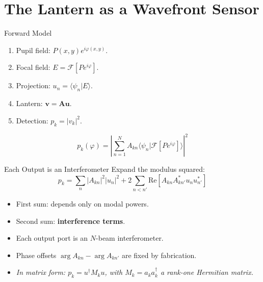 \documentclass[aspectratio=169,10pt]{beamer}
\begin{document}
\section{The Lantern as a Wavefront Sensor}
\begin{frame}{Forward Model}
\begin{enumerate}
    \item Pupil field: \(P(x,y) e^{i\varphi(x,y)}\).
    \item Focal field: \(E = \mathcal{F}[P e^{i\varphi}]\).
    \item Projection: \(u_n = \langle \psi_n | E \rangle\).
    \item Lantern: \(\mathbf{v} = \mathbf{A} \mathbf{u}\).
    \item Detection: \(p_k = |v_k|^2\).
\end{enumerate}
\[
    p_k(\varphi) = \left| \sum_{n=1}^{N} A_{kn} \langle \psi_n | \mathcal{F}[P e^{i\varphi}] \rangle \right|^2
\]
\end{frame}

\begin{frame}{Each Output is an Interferometer}
Expand the modulus squared:
\[
    p_k = \sum_n |A_{kn}|^2 |u_n|^2 + 2 \sum_{n < n'} \mathrm{Re}\left[ A_{kn} A_{kn'}^* u_n u_{n'}^* \right]
\]
\begin{itemize}
    \item First sum: depends only on modal powers.
    \item Second sum: \textbf{interference terms}.
    \item Each output port is an \(N\)-beam interferometer.
    \item Phase offsets \(\arg A_{kn} - \arg A_{kn'}\) are fixed by fabrication.
    \item \emph{In matrix form: $p_k = u^\dagger M_k u$, with $M_k = a_k a_k^\dagger$ a rank-one Hermitian matrix.}
\end{itemize}
\end{frame}
\end{document}
